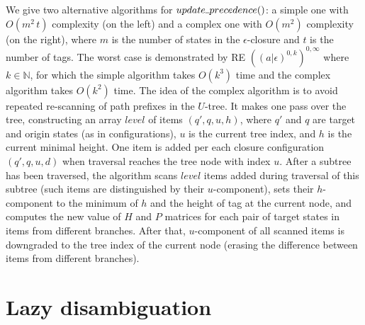 \documentclass[AMA,STIX1COL]{WileyNJD-v2}
\newcommand{\Xund}{\rule{.4em}{.4pt}}
\newcommand{\YN}{\mathbb{N}}
\begin{document}
We give two alternative algorithms for $update \Xund precedence ()$:
a simple one with $O(m^2 \, t)$ complexity (on the left) and a complex one with $O(m^2)$ complexity (on the right),
where $m$ is the number of states in the $\epsilon$-closure and $t$ is the number of tags.
The worst case is demonstrated by RE $((a|\epsilon)^{0,k})^{0,\infty}$ where $k \in \YN$,
for which the simple algorithm takes $O(k^3)$ time and the complex algorithm takes $O(k^2)$ time.
%
The idea of the complex algorithm is to avoid repeated re-scanning of path prefixes in the $U$-tree.
It makes one pass over the tree,
constructing an array $level$ of items $(q', q, u, h)$, where
$q'$ and $q$ are target and origin states (as in configurations),
$u$ is the current tree index, and $h$ is the current minimal height.
One item is added per each closure configuration $(q', q, u, d)$ when traversal reaches the tree node with index $u$.
After a subtree has been traversed,
the algorithm scans $level$ items added during traversal of this subtree (such items are distinguished by their $u$-component),
sets their $h$-component to the minimum of $h$ and the height of tag at the current node,
and computes the new value of $H$ and $P$ matrices for each pair of target states in items from different branches.
After that, $u$-component of all scanned items is downgraded to the tree index of the current node
(erasing the difference between items from different branches).


\section{Lazy disambiguation}\label{section_lazy}
\end{document}
